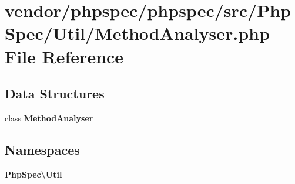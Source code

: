 \section{vendor/phpspec/phpspec/src/\+Php\+Spec/\+Util/\+Method\+Analyser.php File Reference}
\label{_method_analyser_8php}
\subsection*{Data Structures}
\begin{DoxyCompactItemize}
\item 
class {\bf Method\+Analyser}
\end{DoxyCompactItemize}
\subsection*{Namespaces}
\begin{DoxyCompactItemize}
\item 
 {\bf Php\+Spec\textbackslash{}\+Util}
\end{DoxyCompactItemize}
